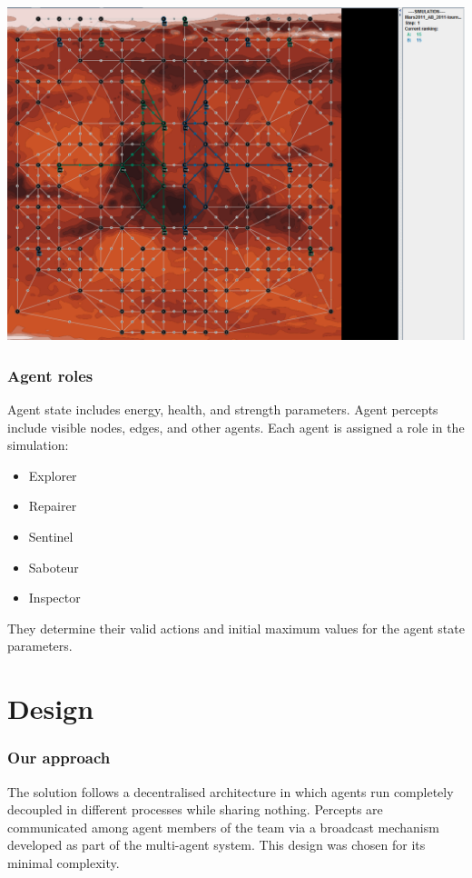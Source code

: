 \documentclass[pdf,xcolor=svgnames]{beamer}
\begin{document}

\begin{frame}
\includegraphics[width=\textwidth]{monitor.png}
\end{frame}


\begin{frame}
\frametitle{Agent roles}
Agent state includes energy, health, and strength parameters. Agent percepts
include visible nodes, edges, and other agents. 
Each agent is assigned a role in the simulation:

\pause
\begin{itemize}
\item Explorer
\item Repairer
\item Sentinel 
\item Saboteur
\item Inspector
\end{itemize} 
\pause

They determine their valid actions and
initial maximum values for the agent state parameters. 

\end{frame}


\section{Design}

\begin{frame}
\frametitle{Our approach}
The solution follows a decentralised architecture in which agents run 
completely decoupled in different processes while sharing nothing. Percepts 
are communicated among agent members of the team via a broadcast mechanism 
developed as part of the multi-agent system. This design was chosen for its 
minimal complexity.
\end{frame}
\end{document}
